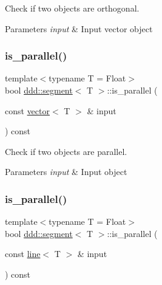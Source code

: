 Check if two objects are orthogonal. 


\begin{DoxyParams}{Parameters}
{\em input} & Input vector object \\
\hline
\end{DoxyParams}
\mbox{\label{classddd_1_1segment_a84c437b0f7838bc439e11cc1687c12ff}} 
\subsubsection{\texorpdfstring{is\+\_\+parallel()}{is\_parallel()}\hspace{0.1cm}{\footnotesize\ttfamily [1/5]}}
{\footnotesize\ttfamily template$<$typename T = Float$>$ \\
bool \hyperlink{classddd_1_1segment}{ddd\+::segment}$<$ T $>$\+::is\+\_\+parallel (\begin{DoxyParamCaption}\item[{const \hyperlink{classddd_1_1vector}{vector}$<$ T $>$ \&}]{input }\end{DoxyParamCaption}) const\hspace{0.3cm}{\ttfamily [inline]}}



Check if two objects are parallel. 


\begin{DoxyParams}{Parameters}
{\em input} & Input object \\
\hline
\end{DoxyParams}
\mbox{\label{classddd_1_1segment_af63ef3a1f60cb14a96e9dbcf6fecaf66}} 
\subsubsection{\texorpdfstring{is\+\_\+parallel()}{is\_parallel()}\hspace{0.1cm}{\footnotesize\ttfamily [2/5]}}
{\footnotesize\ttfamily template$<$typename T = Float$>$ \\
bool \hyperlink{classddd_1_1segment}{ddd\+::segment}$<$ T $>$\+::is\+\_\+parallel (\begin{DoxyParamCaption}\item[{const \hyperlink{classddd_1_1line}{line}$<$ T $>$ \&}]{input }\end{DoxyParamCaption}) const\hspace{0.3cm}{\ttfamily [inline]}}



